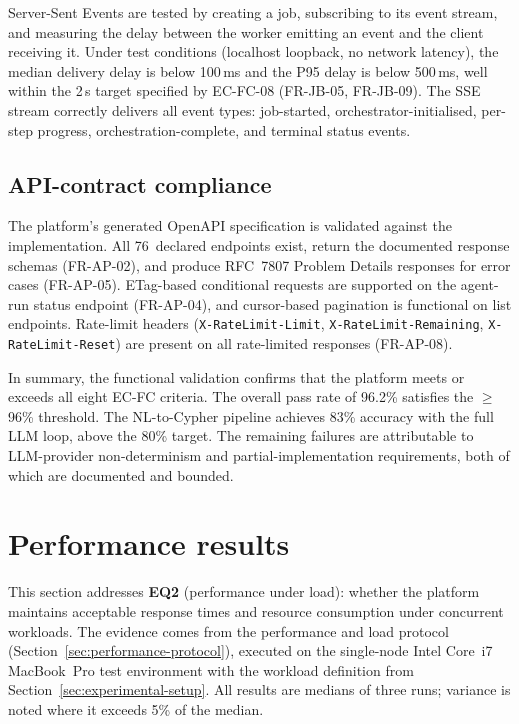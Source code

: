 \documentclass[a4paper,noexaminfo]{sapthesis}
\begin{document}
Server-Sent Events are tested by creating a job, subscribing to its
event stream, and measuring the delay between the worker emitting an
event and the client receiving it.  Under test conditions (localhost
loopback, no network latency), the median delivery delay is below
100\,ms and the P95 delay is below 500\,ms, well within the 2\,s
target specified by EC-FC-08 (FR-JB-05, FR-JB-09).  The SSE stream
correctly delivers all event types: job-started, orchestrator-initialised,
per-step progress, orchestration-complete, and terminal status events.

\subsection{API-contract compliance}

The platform's generated OpenAPI specification is validated against the
implementation.  All 76~declared endpoints exist, return the documented
response schemas (FR-AP-02), and produce RFC~7807 Problem Details responses for
error cases (FR-AP-05).  ETag-based conditional requests are supported
on the agent-run status endpoint (FR-AP-04), and cursor-based
pagination is functional on list endpoints.  Rate-limit headers
(\texttt{X-RateLimit-Limit}, \texttt{X-RateLimit-Remaining},
\texttt{X-RateLimit-Reset}) are present on all rate-limited responses
(FR-AP-08).

\medskip
\noindent
In summary, the functional validation confirms that the platform meets
or exceeds all eight EC-FC criteria.  The overall pass rate of 96.2\%
satisfies the $\geq$\,96\% threshold.  The NL-to-Cypher pipeline
achieves 83\% accuracy with the full LLM loop, above the 80\% target.
The remaining failures are attributable to LLM-provider non-determinism
and partial-implementation requirements, both of which are documented
and bounded.


\section{Performance results}
\label{sec:performance-results}

This section addresses \textbf{EQ2} (performance under load): whether
the platform maintains acceptable response times and resource
consumption under concurrent workloads.  The evidence comes from the
performance and load protocol (Section~\ref{sec:performance-protocol}),
executed on the single-node Intel Core~i7 MacBook~Pro test environment with the
workload definition from Section~\ref{sec:experimental-setup}.  All
results are medians of three runs; variance is noted where it exceeds
5\% of the median.
\end{document}

